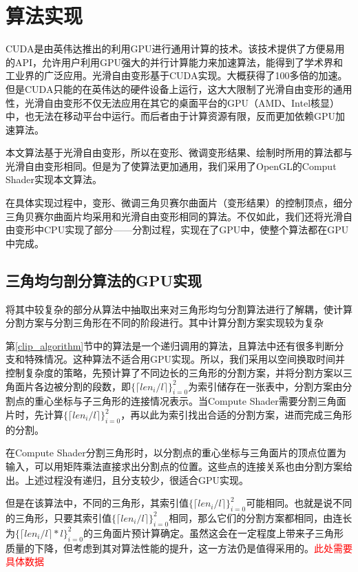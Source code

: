 
\chapter{算法实现}
CUDA是由英伟达推出的利用GPU进行通用计算的技术。该技术提供了方便易用的API，允许用户利用GPU强大的并行计算能力来加速算法，能得到了学术界和工业界的广泛应用。光滑自由变形\cite{Cui15}基于CUDA实现。大概获得了100多倍的加速。但是CUDA只能的在英伟达的硬件设备上运行，这大大限制了光滑自由变形的通用性，光滑自由变形不仅无法应用在其它的桌面平台的GPU（AMD、Intel核显）中，也无法在移动平台中运行。而后者由于计算资源有限，反而更加依赖GPU加速算法。

本文算法基于光滑自由变形\cite{Cui15}，所以在变形、微调变形结果、绘制时所用的算法都与光滑自由变形相同。但是为了使算法更加通用，我们采用了OpenGL的Comput Shader实现本文算法。


在具体实现过程中，变形、微调三角贝赛尔曲面片（变形结果）的控制顶点，细分三角贝赛尔曲面片均采用和光滑自由变形相同的算法。不仅如此，我们还将光滑自由变形中CPU实现了部分——分割过程，实现在了GPU中，使整个算法都在GPU中完成。



\section{三角均匀剖分算法的GPU实现}
将其中较复杂的部分从算法中抽取出来对三角形均匀分割算法进行了解耦，使计算分割方案与分割三角形在不同的阶段进行。其中计算分割方案实现较为复杂

第\autoref{clip_algorithm}节中的算法是一个递归调用的算法，且算法中还有很多判断分支和特殊情况。这种算法不适合用GPU实现。所以，我们采用以空间换取时间并控制复杂度的策略，先预计算了不同边长的三角形的分割方案，并将分割方案以三角面片各边被分割的段数，即$\{\lceil len_i/l \rceil\}^{2}_{i=0}$为索引储存在一张表中，分割方案由分割点的重心坐标与子三角形的连接情况表示。当Compute Shader需要分割三角面片时，先计算$\{\lceil len_i/l \rceil\}^{2}_{i=0}$，再以此为索引找出合适的分割方案，进而完成三角形的分割。

在Compute Shader分割三角形时，以分割点的重心坐标与三角面片的顶点位置为输入，可以用矩阵乘法直接求出分割点的位置。这些点的连接关系也由分割方案给出。上述过程没有递归，且分支较少，很适合GPU实现。

但是在该算法中，不同的三角形，其索引值$\{\lceil len_i/l \rceil\}^{2}_{i=0}$可能相同。也就是说不同的三角形，只要其索引值$\{\lceil len_i/l \rceil\}^{2}_{i=0}$相同，那么它们的分割方案都相同，由连长为$\{\lceil len_i/l \rceil * l\}^{2}_{i=0}$的三角面片预计算确定。虽然这会在一定程度上带来子三角形质量的下降，但考虑到其对算法性能的提升，这一方法仍是值得采用的。\textcolor{red}{此处需要具体数据}



